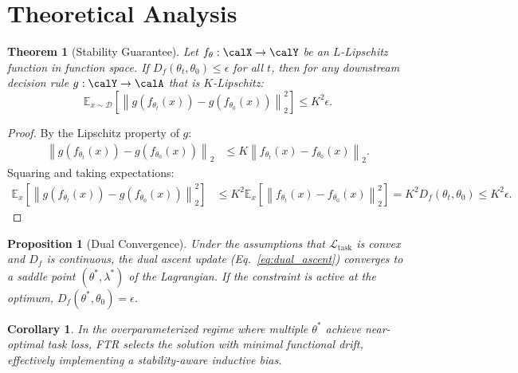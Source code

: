 \documentclass{article}
\newtheorem{theorem}{Theorem}
\newtheorem{proposition}{Proposition}
\newtheorem{corollary}{Corollary}
\newcommand{\E}{\mathbb{E}}
\newcommand{\norm}[1]{\left\|#1\right\|}
\newcommand{\Df}{D_f}
\newcommand{\calD}{\mathcal{D}}
\newcommand{\calL}{\mathcal{L}}
\begin{document}
\section{Theoretical Analysis}

\begin{theorem}[Stability Guarantee]
\label{thm:stability_guarantee}
Let $f_\theta: \calX \to \calY$ be an $L$-Lipschitz function in function space. If $\Df(\theta_t, \theta_0) \leq \epsilon$ for all $t$, then for any downstream decision rule $g: \calY \to \calA$ that is $K$-Lipschitz:
\begin{equation}
\E_{x \sim \calD}\left[\norm{g(f_{\theta_t}(x)) - g(f_{\theta_0}(x))}_2^2\right] \leq K^2 \epsilon.
\end{equation}
\end{theorem}

\begin{proof}
By the Lipschitz property of $g$:
\begin{align}
\norm{g(f_{\theta_t}(x)) - g(f_{\theta_0}(x))}_2 &\leq K \norm{f_{\theta_t}(x) - f_{\theta_0}(x)}_2.
\end{align}
Squaring and taking expectations:
\begin{align}
\E_{x}\left[\norm{g(f_{\theta_t}(x)) - g(f_{\theta_0}(x))}_2^2\right] &\leq K^2 \E_x\left[\norm{f_{\theta_t}(x) - f_{\theta_0}(x)}_2^2\right] = K^2 \Df(\theta_t, \theta_0) \leq K^2 \epsilon.
\end{align}
\end{proof}

\begin{proposition}[Dual Convergence]
\label{prop:dual_convergence}
Under the assumptions that $\calL_{\text{task}}$ is convex and $\Df$ is continuous, the dual ascent update (Eq.~\ref{eq:dual_ascent}) converges to a saddle point $(\theta^*, \lambda^*)$ of the Lagrangian. If the constraint is active at the optimum, $\Df(\theta^*, \theta_0) = \epsilon$.
\end{proposition}

\begin{corollary}
In the overparameterized regime where multiple $\theta^*$ achieve near-optimal task loss, FTR selects the solution with minimal functional drift, effectively implementing a stability-aware inductive bias.
\end{corollary}
\end{document}
